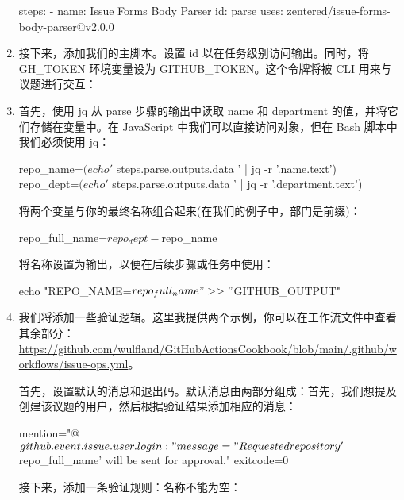 \begin{enumerate}
\begin{shell}
steps:
  - name: Issue Forms Body Parser
    id: parse
    uses: zentered/issue-forms-body-parser@v2.0.0
\end{shell}

\item 
接下来，添加我们的主脚本。设置 id 以在任务级别访问输出。同时，将 GH\_TOKEN 环境变量设为 GITHUB\_TOKEN。这个令牌将被 CLI 用来与议题进行交互：


\item 
首先，使用 jq 从 parse 步骤的输出中读取 name 和 department 的值，并将它们存储在变量中。在 JavaScript 中我们可以直接访问对象，但在 Bash 脚本中我们必须使用 jq：

\begin{shell}
repo_name=$(echo '${{ steps.parse.outputs.data }}' | jq -r '.name.text')
repo_dept=$(echo '${{ steps.parse.outputs.data }}' | jq -r '.department.text')
\end{shell}

将两个变量与你的最终名称组合起来(在我们的例子中，部门是前缀)：

\begin{shell}
repo_full_name=$repo_dept-$repo_name
\end{shell}

将名称设置为输出，以便在后续步骤或任务中使用：

\begin{shell}
echo "REPO_NAME=$repo_full_name" >> "$GITHUB_OUTPUT"
\end{shell}

\item 
我们将添加一些验证逻辑。这里我提供两个示例，你可以在工作流文件中查看其余部分：\url{https://github.com/wulfland/GitHubActionsCookbook/blob/main/.github/workflows/issue-ops.yml}。

首先，设置默认的消息和退出码。默认消息由两部分组成：首先，我们想提及创建该议题的用户，然后根据验证结果添加相应的消息：

\begin{shell}
mention="@${{ github.event.issue.user.login }}: "
message="Requested repository '$repo_full_name' will be sent for approval."
exitcode=0
\end{shell}

接下来，添加一条验证规则：名称不能为空：


\end{enumerate}
